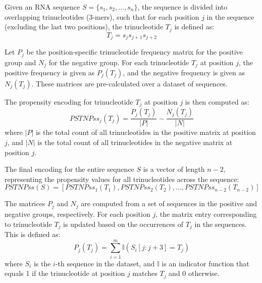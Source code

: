     Given an RNA sequence $S = \{s_1, s_2, \dots, s_n\}$, the sequence is divided into overlapping trinucleotides (3-mers), such that for each position $j$ in the sequence (excluding the last two positions), the trinucleotide $T_j$ is defined as:
    \[
      T_j = s_j s_{j+1} s_{j+2}
    \]

    Let $P_j$ be the position-specific trinucleotide frequency matrix for the positive group and $N_j$ for the negative group. For each trinucleotide $T_j$ at position $j$, the positive frequency is given as $P_j(T_j)$, and the negative frequency is given as $N_j(T_j)$. These matrices are pre-calculated over a dataset of sequences.

    The propensity encoding for trinucleotide $T_j$ at position $j$ is then computed as:
    \[
      PSTNPss_j(T_j) = \frac{P_j(T_j)}{|P|} - \frac{N_j(T_j)}{|N|}
    \]
    where $|P|$ is the total count of all trinucleotides in the positive matrix at position $j$, and $|N|$ is the total count of all trinucleotides in the negative matrix at position $j$.

    The final encoding for the entire sequence $S$ is a vector of length $n - 2$, representing the propensity values for all trinucleotides across the sequence:
    \[
      PSTNPss(S) = [PSTNPss_1(T_1), PSTNPss_2(T_2), \dots, PSTNPss_{n-2}(T_{n-2})]
    \]

    The matrices $P_j$ and $N_j$ are computed from a set of sequences in the positive and negative groups, respectively. For each position $j$, the matrix entry corresponding to trinucleotide $T_j$ is updated based on the occurrences of $T_j$ in the sequences. This is defined as:
    \[
      P_j(T_j) = \sum_{i=1}^{m} \mathbb{I}(S_i[j:j+3] = T_j)
    \]
    where $S_i$ is the $i$-th sequence in the dataset, and $\mathbb{I}$ is an indicator function that equals 1 if the trinucleotide at position $j$ matches $T_j$ and 0 otherwise.

